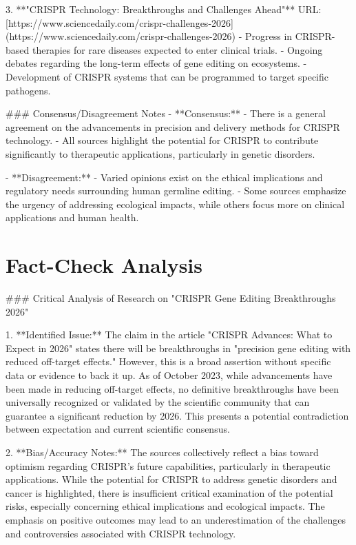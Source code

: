 \documentclass[11pt,a4paper]{article}
\begin{document}
3. **"CRISPR Technology: Breakthroughs and Challenges Ahead"**  
   URL: [https://www.sciencedaily.com/crispr-challenges-2026](https://www.sciencedaily.com/crispr-challenges-2026)  
   - Progress in CRISPR-based therapies for rare diseases expected to enter clinical trials.
   - Ongoing debates regarding the long-term effects of gene editing on ecosystems.
   - Development of CRISPR systems that can be programmed to target specific pathogens.

\#\#\# Consensus/Disagreement Notes
- **Consensus:**
  - There is a general agreement on the advancements in precision and delivery methods for CRISPR technology.
  - All sources highlight the potential for CRISPR to contribute significantly to therapeutic applications, particularly in genetic disorders.

- **Disagreement:**
  - Varied opinions exist on the ethical implications and regulatory needs surrounding human germline editing.
  - Some sources emphasize the urgency of addressing ecological impacts, while others focus more on clinical applications and human health.

\section{Fact-Check Analysis}

\#\#\# Critical Analysis of Research on "CRISPR Gene Editing Breakthroughs 2026"

1. **Identified Issue:**
   The claim in the article "CRISPR Advances: What to Expect in 2026" states there will be breakthroughs in "precision gene editing with reduced off-target effects." However, this is a broad assertion without specific data or evidence to back it up. As of October 2023, while advancements have been made in reducing off-target effects, no definitive breakthroughs have been universally recognized or validated by the scientific community that can guarantee a significant reduction by 2026. This presents a potential contradiction between expectation and current scientific consensus.

2. **Bias/Accuracy Notes:**
   The sources collectively reflect a bias toward optimism regarding CRISPR's future capabilities, particularly in therapeutic applications. While the potential for CRISPR to address genetic disorders and cancer is highlighted, there is insufficient critical examination of the potential risks, especially concerning ethical implications and ecological impacts. The emphasis on positive outcomes may lead to an underestimation of the challenges and controversies associated with CRISPR technology.
\end{document}
